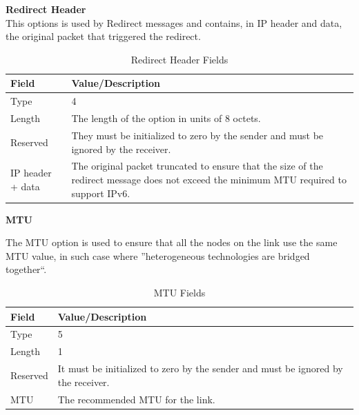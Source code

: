 \documentclass[12pt]{article}
\begin{document}
\textbf{Redirect Header}\\

This options is used by Redirect messages and contains, in IP header and data, the original packet that triggered the redirect.\\

\begin{savenotes}
\begin{table}[!htpb]
\centering
\addtolength{\tabcolsep}{3pt}
\begin{tabular}{|L{3.0cm}|L{12.0cm}|}
\hline
Field&Value/Description\\
\hline
Type&4\\
\hline
Length&The length of the option in units of 8 octets.\\
\hline
Reserved&They must be initialized to zero by the sender and must be ignored by the receiver.\\
\hline
IP header + data&The original packet truncated to ensure that the size of the redirect message does not exceed the minimum MTU required to support IPv6.\\
\hline
\end{tabular}
\caption{Redirect Header Fields}
\label{table:redirHead}
\end{table}
\end{savenotes}

\textbf{MTU}

The MTU option is used to ensure that all the nodes on the link use the same MTU value, in such case where ''heterogeneous technologies are bridged together``.\\

\begin{savenotes}
\begin{table}[!htpb]
\centering
\addtolength{\tabcolsep}{3pt}
\begin{tabular}{|L{3.0cm}|L{12.0cm}|}
\hline
Field&Value/Description\\
\hline
Type&5\\
\hline
Length&1\\
\hline
Reserved&It must be initialized to zero by the sender and must be ignored by the receiver.\\
\hline
MTU&The recommended MTU for the link.\\
\hline
\end{tabular}
\caption{MTU Fields}
\label{table:mtu}
\end{table}
\end{savenotes}
\end{document}
